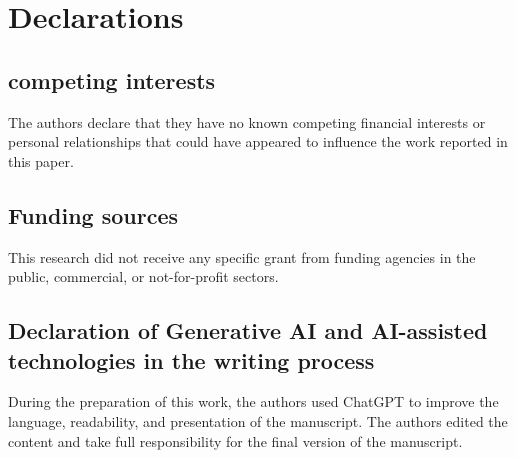 \documentclass[11pt]{article}
\numberwithin{equation}{section}
\theoremstyle{definition}
\begin{document}
\section*{Declarations}
\subsection*{competing interests} The authors declare that they have no known competing financial interests or personal relationships that could have appeared to influence the work reported in this paper.

\subsection*{Funding sources}
This research did not receive any specific grant from funding agencies in the public, commercial, or not-for-profit sectors.

\subsection*{Declaration of Generative AI and AI-assisted technologies in the writing process}
During the preparation of this work, the authors used ChatGPT to improve the language, readability, and presentation of the manuscript. The authors edited the content and take full responsibility for the final version of the manuscript.
\end{document}
